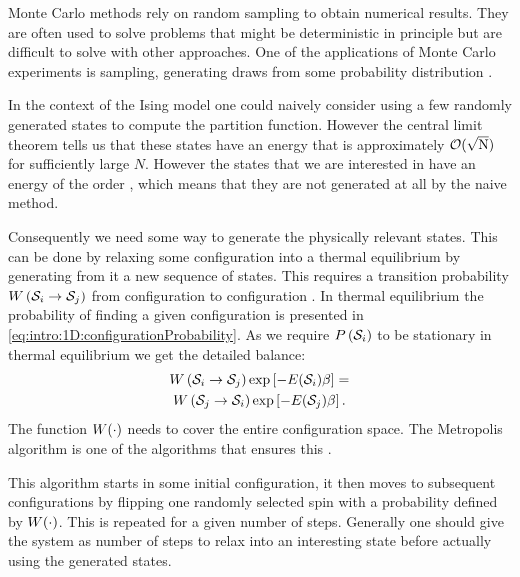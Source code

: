 
Monte Carlo methods rely on random sampling to obtain numerical results. They are often used to solve problems that might be deterministic in principle but are difficult to solve with other approaches. One of the applications of Monte Carlo experiments is sampling, \ie generating draws from some probability distribution \cite{kroese2014monte}. 

In the context of the Ising model one could naively consider using a few randomly generated states to compute the partition function. However the central limit theorem tells us that these states have an energy that is approximately $\mathcal{O}(\sqrt{\mathrm{N}})$ for sufficiently large $N$. However the states that we are interested in have an energy of the order \bigOh{\numberOfSpins}, which means that they are not generated at all by the naive method. 

Consequently we need some way to generate the physically relevant states. This can be done by relaxing some configuration into a thermal equilibrium by generating from it a new sequence of states. This requires a transition probability $W\left(\mathcal{S}_{i} \to \mathcal{S}_{j} \right)$ from configuration  to configuration . In thermal equilibrium the probability of finding a given configuration is presented in \cref{eq:intro:1D:configurationProbability}. As we require $P\left(\mathcal{S}_{i}\right)$ to be stationary in thermal equilibrium we get the detailed balance:
\begin{multline}\label{eq:intro:mcm:detailedbalance}
	W\left(\mathcal{S}_{i} \to \mathcal{S}_{j}\right)\exp\left[-E(\mathcal{S}_{i})\beta \right] = \\
	W\left(\mathcal{S}_{j} \to \mathcal{S}_{i}\right)\exp\left[-E(\mathcal{S}_{j})\beta \right].
\end{multline}
The function $W(\cdot)$ needs to cover the entire configuration space. The Metropolis algorithm is one of the algorithms that ensures this \cite{kenzel1997physics}. 

This algorithm starts in some initial configuration, it then moves to subsequent configurations by flipping one randomly selected spin with a probability defined by \mbox{$W(\cdot)$}. This is repeated for a given number of steps. Generally one should give the system as number of steps to relax into an interesting state before actually using the generated states.